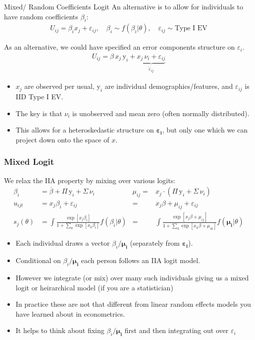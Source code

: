 \documentclass[aspectratio=169,11pt]{beamer}
\begin{document}
\begin{frame}{Mixed/ Random Coefficients Logit}
An alternative is to allow for individuals to have \alert{random coefficients} $\beta_i$:
\begin{eqnarray*}
U_{ij} = \beta_i x_{j} +  \varepsilon_{ij}, \quad \beta_i \sim f( \beta_i | \theta),  \quad \varepsilon_{ij} \sim \text{Type I EV}
\end{eqnarray*}

As an alternative, we could have specified an error components structure on $\varepsilon_i$.
\begin{align*}
U_{ij} = \beta \, x_{j} \, \textrm{y}_i + \underbrace{x_{j} \, \nu_i  + \varepsilon_{ij}}_{\tilde{\varepsilon}_{ij}}
\end{align*}
\vspace{-0.8cm}
\begin{itemize}
\item $x_{j}$ are observed per usual, $\textrm{y}_i$ are individual demographics/features, and $\varepsilon_{ij}$ is IID Type I EV.
\item The key is that $\nu_i$ is unobserved and mean zero (often normally distributed).
\item This allows for a heteroskedastic structure on $\symbf{\varepsilon_{i}}$, but only one which we can project down onto the space of $x$.
\end{itemize}

\end{frame}


\begin{frame}
\frametitle{Mixed Logit}
We relax the IIA property by mixing over various logits:
\begin{align*}
\beta_i &= \overline{\beta} + \Pi \, \textrm{y}_i  + \Sigma \, \nu_i   
&\mu_{ij}=&   x_{j} \cdot \left(  \Pi \, \textrm{y}_i + \Sigma \, \nu_{i} \right) \\
u_{ijt} &= x_j \beta_i + \varepsilon_{ij}  
&=&  x_j \beta  + \mu_{ij}+ \varepsilon_{ij}   \\
s_{j}(\theta) &= \int \frac{\exp[x_{j} \beta_i ]}{1+\sum_k \exp[x_{k} \beta_i ]} f(\beta_i | \theta) 
&=& \int \frac{\exp[x_{j} \beta + \mu_{ij} ]}{1+\sum_k \exp[x_{k} \beta+ \mu_{ik} ]} f(\symbf{\mu_i} | \theta)
\end{align*}
 \begin{itemize}
 \item Each individual draws a vector $\beta_i\symbf{/\mu_i}$ (separately from $\symbf{\varepsilon_i}$).
 \item Conditional on $\beta_i\symbf{/\mu_i}$ each person follows an IIA logit model.
 \item However we integrate (or mix) over many such individuals giving us a \alert{mixed logit} or \alert{heirarchical model} (if you are a statistician)
 \item In practice these are not that different from linear \alert{random effects models} you have learned about in econometrics.
 \item It helps to think about fixing $\beta_i\symbf{/\mu_i}$ first and then integrating out over $\varepsilon_i$
 \end{itemize}
\end{frame}
\end{document}
